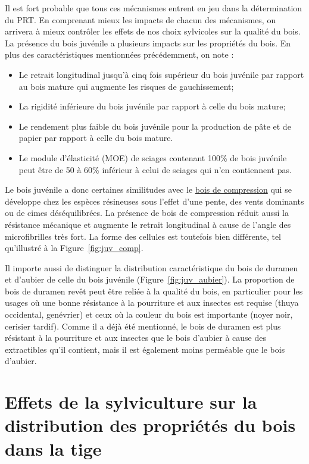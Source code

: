 Il est fort probable que tous ces mécanismes entrent en jeu dans la détermination du PRT. En comprenant mieux les impacts de chacun des mécanismes, on arrivera à mieux contrôler les effets de nos choix sylvicoles sur la qualité du bois.\\

La présence du bois juvénile a plusieurs impacts sur les propriétés du bois. En plus des caractéristiques mentionnées précédemment, on note :

\begin{itemize}
\item Le retrait longitudinal jusqu'à cinq fois supérieur du bois juvénile par rapport au bois mature qui augmente les risques de gauchissement;
\item La rigidité inférieure du bois juvénile par rapport à celle du bois mature;
\item Le rendement plus faible du bois juvénile pour la production de pâte et de papier par rapport à celle du bois mature.
\item Le module d'élasticité (MOE) de sciages contenant 100\% de bois juvénile peut être de 50 à 60\% inférieur à celui de sciages qui n'en contiennent pas.
\end{itemize}

Le bois juvénile a donc certaines similitudes avec le \hyperref[compression]{bois de compression} qui se développe chez les espèces résineuses sous l'effet d'une pente, des vents dominants ou de cimes déséquilibrées. La présence de bois de compression réduit aussi la résistance mécanique et augmente le retrait longitudinal à cause de l'angle des microfibrilles très fort. La forme des cellules est toutefois bien différente, tel qu’illustré à la Figure~\ref{fig:juv_comp}.

Il importe aussi de distinguer la distribution caractéristique du bois de duramen et d'aubier de celle du bois juvénile (Figure~\ref{fig:juv_aubier}). La proportion de bois de duramen revêt peut être reliée à la qualité du bois, en particulier pour les usages où une bonne résistance à la pourriture et aux insectes est requise (thuya occidental, genévrier) et ceux où la couleur du bois est importante (noyer noir, cerisier tardif). Comme il a déjà été mentionné, le bois de duramen est plus résistant à la pourriture et aux insectes que le bois d'aubier à cause des extractibles qu'il contient, mais il est également moins perméable que le bois d'aubier.
 

\section{Effets de la sylviculture sur la distribution des propriétés du bois dans la tige}

